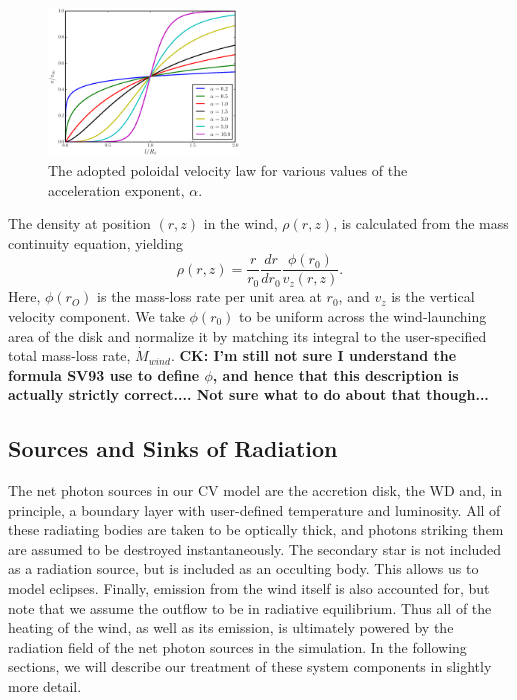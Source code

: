 \documentclass[preprint, a4paper, 11pt]{aastex}
\begin{document}
\begin{figure}
\centering
\includegraphics[width=0.45\textwidth]{figures/acc_law.eps}
\caption{
The adopted poloidal velocity law for various values of the
acceleration exponent, $\alpha$.} 
\label{acc_law}
\end{figure}

The density at position $(r,z)$ in the wind, $\rho(r,z)$, is
calculated from the mass continuity equation, yielding
\begin{equation}
\rho(r,z) = \frac{r}{r_0} \frac{dr}{dr_0} \frac{\phi(r_0)}{v_z(r,z)}.
\label{density}
\end{equation}
Here, $\phi(r_O)$ is the mass-loss rate per unit area at $r_0$, 
and $v_z$ is the vertical velocity component. We take $\phi(r_0)$ to be
uniform across the wind-launching area of the disk and normalize it by
matching its integral to the user-specified total mass-loss rate,
$\dot{M}_{wind}$. 
{\bf CK: I'm still not sure I understand the formula
  SV93 use to define $\phi$, and hence that this description is
  actually strictly correct.... Not sure what to do about that
  though...}

\subsection{Sources and Sinks of Radiation}
\label{radsources}

The net photon sources in our CV model are the accretion disk, the
WD and, in principle, a boundary layer with user-defined temperature
and luminosity. All of these radiating bodies are taken to be
optically thick, and photons striking them are assumed to be destroyed
instantaneously. The secondary star is not included as a radiation
source, but is included as an occulting body. This allows us to model
eclipses. Finally, emission from the wind itself is also accounted for, but
note that we assume the outflow to be in radiative equilibrium. Thus all
of the heating of the wind, as well as its emission, is ultimately
powered by the radiation field of the net photon sources in the
simulation. In the following sections, we will describe our treatment
of these system components in slightly more detail.
\end{document}
